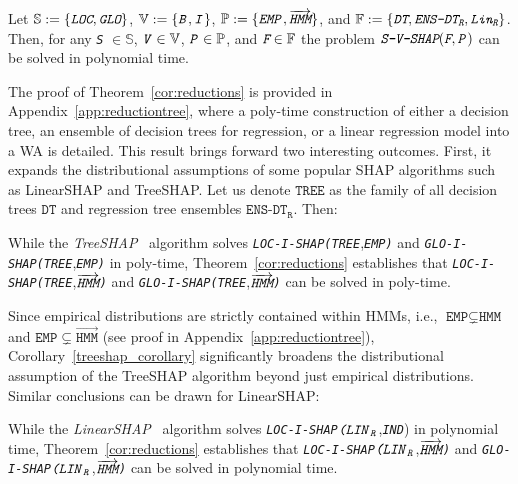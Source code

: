 \begin{theorem} \label{cor:reductions}
    Let $\mathbb{S}:= \{ \emph{\texttt{LOC}}, \emph{\texttt{GLO}} \}$, $\mathbb{V} := \{\texttt{\emph{B}}, \texttt{\emph{I}}\}$, $\mathbb{P}:= \{ \texttt{\emph{EMP}}, \overrightarrow{\emph{\texttt{HMM}}} \} $, and $\mathbb{F}:= \{\emph{\texttt{DT}}, \emph{\texttt{ENS-DT}}_{\emph{\texttt{R}}}, \emph{\texttt{Lin}}_{\emph{\texttt{R}}}\}$. Then, for any \emph{\texttt{S}} $\in \mathbb{S}$, $\texttt{\emph{V}} \in \mathbb{V}$, $\texttt{\emph{P}} \in \mathbb{P}$, and $\emph{\texttt{F}}\in \mathbb{F}$ the problem  $\emph{\texttt{S-V-SHAP}}(\emph{\texttt{F}}, \texttt{\emph{P}})$ can be solved in polynomial time.
\end{theorem}

The proof of Theorem~\ref{cor:reductions} is provided in Appendix~\ref{app:reductiontree}, where a poly-time construction of either a decision tree, an ensemble of decision trees for regression, or a linear regression model into a WA is detailed. This result brings forward two interesting outcomes. First, it expands the distributional assumptions of some popular SHAP algorithms such as LinearSHAP and TreeSHAP. Let us denote $\texttt{TREE}$ as the family of all decision trees $\texttt{DT}$ and regression tree ensembles $\texttt{ENS-DT}_{\texttt{R}}$. Then:

\begin{corollary}
\label{treeshap_corollary}
    While the \emph{TreeSHAP}~\citep{lundbergnature} algorithm solves \texttt{\emph{LOC-I-SHAP}}\texttt{\emph{(TREE}},\texttt{\emph{EMP)}} and \texttt{\emph{GLO-I-SHAP}}\texttt{\emph{(TREE}},\texttt{\emph{EMP)}} in poly-time, Theorem~\ref{cor:reductions} establishes that \texttt{\emph{LOC-I-SHAP}}\texttt{\emph{(TREE}},$\overrightarrow{\emph{\texttt{\text{HMM}}}}$\texttt{\emph{)}} and \texttt{\emph{GLO-I-SHAP}}\texttt{\emph{(TREE}},$\overrightarrow{\emph{\texttt{\text{HMM}}}}$\texttt{\emph{)}} can be solved in poly-time.
\end{corollary}

Since empirical distributions are strictly contained within HMMs, i.e., $\texttt{EMP}\subsetneq \texttt{HMM}$ and $\texttt{EMP}\subsetneq \overrightarrow{\texttt{HMM}}$ (see proof in Appendix~\ref{app:reductiontree}), Corollary~\ref{treeshap_corollary} significantly broadens the distributional assumption of the TreeSHAP algorithm beyond just empirical distributions. Similar conclusions can be drawn for LinearSHAP:

\begin{corollary}
    While the \emph{LinearSHAP}~\citep{lundberg2017} algorithm solves \texttt{\emph{LOC-I-SHAP}}$\texttt{\emph{(LIN}}_\texttt{\emph{R}}$,\texttt{\emph{IND}}) in polynomial time, Theorem~\ref{cor:reductions} establishes that \texttt{\emph{LOC-I-SHAP}}$\texttt{\emph{(LIN}}_\texttt{\emph{R}}$,$\overrightarrow{\emph{\texttt{\text{HMM}}}}$\texttt{\emph{)}} and \texttt{\emph{GLO-I-SHAP}}$\texttt{\emph{(LIN}}_\texttt{\emph{R}}$,$\overrightarrow{\emph{\texttt{\text{HMM}}}}$\texttt{\emph{)}} can be solved in polynomial time.
\end{corollary}


